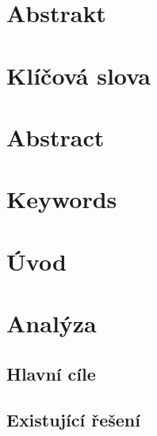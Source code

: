 \documentclass[a4paper,11pt,titlepage,fleqn]{article}
\begin{document}


\setcounter{page}{3}

\newpage
\thispagestyle{plain}
\section*{Abstrakt}

\section*{Klíčová slova}

\thispagestyle{empty}
\newpage

\section*{Abstract}

\section*{Keywords}

\thispagestyle{empty}

\newpage
\tableofcontents

\newpage
\listoffigures
\listoftables
\lstlistoflistings
\newpage
\printglossary[type=\acronymtype,title=Seznam zkratek]
\cleardoublepage


\section{Úvod}


\newpage
\section{Analýza}

    \subsection{Hlavní cíle}

    \subsection{Existující řešení}
\end{document}
